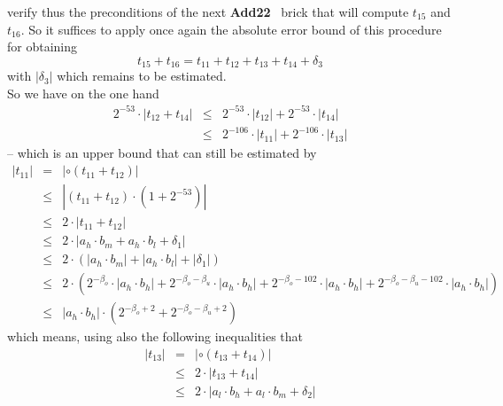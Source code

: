\documentclass[a4paper,10pt,twoside]{article}
\newenvironment{proof}[1][Proof]{\begin{trivlist}
\item[\hskip \labelsep {\bfseries #1}]}{\end{trivlist}}
\newcommand{\hi}{\ensuremath{\mathit{h}}}
\newcommand{\mi}{\ensuremath{\mathit{m}}}
\newcommand{\lo}{\ensuremath{\mathit{l}}}
\newcommand{\AddDD}{{\bf Add22}}
\begin{document}
\begin{proof}
verify thus the preconditions of the next \AddDD~ brick that will compute $t_{15}$ and $t_{16}$.
So it suffices to apply once again the absolute error bound of this procedure for obtaining
$$t_{15} + t_{16} = t_{11} + t_{12} + t_{13} + t_{14} + \delta_3$$ with $\left \vert \delta_3 \right \vert$ which remains to be
estimated.\\
So we have on the one hand
\begin{eqnarray*}
2^{-53} \cdot \left \vert t_{12} + t_{14} \right \vert & \leq & 2^{-53} \cdot \left \vert t_{12} \right \vert + 2^{-53} \cdot
\left \vert t_{14} \right \vert \\
& \leq & 2^{-106} \cdot \left \vert t_{11} \right \vert + 2^{-106} \cdot \left \vert t_{13} \right \vert
\end{eqnarray*}
-- which is an upper bound that can still be estimated by
\begin{eqnarray*}
\left \vert t_{11} \right \vert & = & \left \vert \circ \left( t_{11} + t_{12} \right) \right \vert \\
& \leq & \left \vert \left( t_{11} + t_{12} \right) \cdot \left( 1 + 2^{-53} \right) \right \vert \\
& \leq & 2 \cdot \left \vert t_{11} + t_{12} \right \vert \\
& \leq & 2 \cdot \left \vert a_\hi \cdot b_\mi + a_\hi \cdot b_\lo + \delta_1 \right \vert \\
& \leq & 2 \cdot \left( \left \vert a_\hi \cdot b_\mi \right \vert + \left \vert a_\hi \cdot b_\lo \right \vert + \left \vert \delta_1 \right \vert
\right) \\
& \leq & 2 \cdot \left( 2^{-\beta_o} \cdot \left \vert a_\hi \cdot b_\hi \right \vert +
2^{-\beta_o-\beta_u} \cdot \left \vert a_\hi \cdot b_\hi \right \vert +
2^{-\beta_o-102} \cdot \left \vert a_\hi \cdot b_\hi \right \vert + 2^{-\beta_o-\beta_u-102} \cdot \left \vert a_\hi \cdot b_\hi \right \vert \right) \\
& \leq & \left \vert a_\hi \cdot b_\hi \right \vert \cdot \left( 2^{-\beta_o+2} + 2^{-\beta_o-\beta_u+2} \right)
\end{eqnarray*}
which means, using also the following inequalities that
\begin{eqnarray*}
\left \vert t_{13} \right \vert & = & \left \vert \circ \left( t_{13} + t_{14} \right) \right \vert \\
& \leq & 2 \cdot \left \vert t_{13} + t_{14} \right \vert \\
& \leq & 2 \cdot \left \vert a_\lo \cdot b_\hi + a_\lo \cdot b_\mi + \delta_2 \right \vert \\

\end{eqnarray*}
\end{proof}
\end{document}
